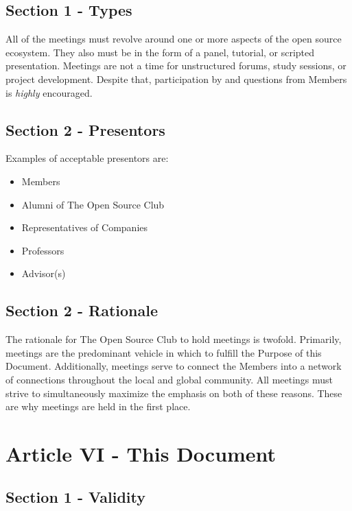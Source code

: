 \documentclass{article}
\begin{document}
  \subsection{Section 1 - Types}

  All of the meetings must revolve around one or more aspects of the open source ecosystem. They also must be in the form of a panel, tutorial, or scripted presentation. Meetings are not a time for unstructured forums, study sessions, or project development. Despite that, participation by and questions from Members is \textit{highly} encouraged.

  \subsection{Section 2 - Presentors}

  Examples of acceptable presentors are:

  \begin{itemize}
    \item Members
    \item Alumni of The Open Source Club
    \item Representatives of Companies
    \item Professors
    \item Advisor(s)
  \end{itemize}
  
  \subsection{Section 2 - Rationale}

  The rationale for The Open Source Club to hold meetings is twofold. Primarily, meetings are the predominant vehicle in which to fulfill the Purpose of this Document. Additionally, meetings serve to connect the Members into a network of connections throughout the local and global community. All meetings must strive to simultaneously maximize the emphasis on both of these reasons. These are why meetings are held in the first place.

	\section{Article VI - This Document}

  \subsection{Section 1 - Validity}
\end{document}
